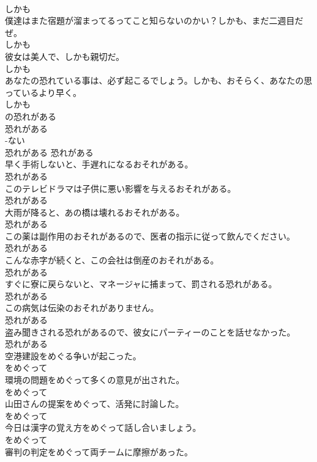 \documentclass[8pt]{extreport}
\begin{document}
\begin{CJK}{UTF8}{min}
\\	しかも	
\\	僕達はまた宿題が溜まってるってこと知らないのかい？しかも、まだ二週目だぜ。	
\\	しかも	
\\	彼女は美人で、しかも親切だ。	
\\	しかも	
\\	あなたの恐れている事は、必ず起こるでしょう。しかも、おそらく、あなたの思っているより早く。	
\\	しかも	
\\	の恐れがある	
\\	恐れがある	
\\	-ない
\\	恐れがある	恐れがある	
\\	早く手術しないと、手遅れになるおそれがある。	
\\	恐れがある	
\\	このテレビドラマは子供に悪い影響を与えるおそれがある。	
\\	恐れがある	
\\	大雨が降ると、あの橋は壊れるおそれがある。	
\\	恐れがある	
\\	この薬は副作用のおそれがあるので、医者の指示に従って飲んでください。	
\\	恐れがある	
\\	こんな赤字が続くと、この会社は倒産のおそれがある。	
\\	恐れがある	
\\	すぐに寮に戻らないと、マネージャに捕まって、罰される恐れがある。	
\\	恐れがある	
\\	この病気は伝染のおそれがありません。	
\\	恐れがある	
\\	盗み聞きされる恐れがあるので、彼女にパーティーのことを話せなかった。	
\\	恐れがある	
\\	空港建設をめぐる争いが起こった。	
\\	をめぐって	
\\	環境の問題をめぐって多くの意見が出された。	
\\	をめぐって	
\\	山田さんの提案をめぐって、活発に討論した。	
\\	をめぐって	
\\	今日は漢字の覚え方をめぐって話し合いましょう。	
\\	をめぐって	
\\	審判の判定をめぐって両チームに摩擦があった。	

\end{CJK}
\end{document}
